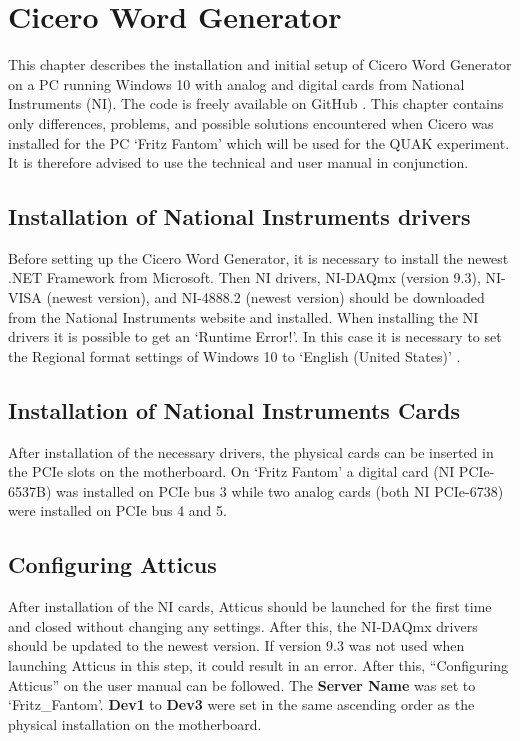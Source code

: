 
\chapter{Cicero Word Generator}\label{chap:Cicero, Cicero Word Generator}
This chapter describes the installation and initial setup of Cicero Word Generator \autocite{keshet2013distributed} on a PC running Windows 10 with analog and digital cards from National Instruments (NI). The code is freely available on GitHub \autocite{akeshet:Github}. This chapter contains only differences, problems, and possible solutions encountered when Cicero was installed for the PC `Fritz Fantom' which will be used for the QUAK experiment. It is therefore advised to use the technical and user manual \autocite{akeshet:manual} in conjunction.

\section{Installation of National Instruments drivers}\label{sec:Cicero, Installation of National Instruments drivers}
Before setting up the Cicero Word Generator, it is necessary to install the newest .NET Framework \autocite{microsoft:download.net} from Microsoft. Then NI drivers, NI-DAQmx (version 9.3), NI-VISA (newest version), and NI-4888.2 (newest version) should be downloaded from the National Instruments website \autocite{ni:drivers} and installed. When installing the NI drivers it is possible to get an `Runtime Error!'. In this case it is necessary to set the Regional format settings of Windows 10 to `English (United States)' \autocite{ni:runtimeerror}.

\section{Installation of National Instruments Cards}\label{sec:Cicero, Installation of National Instruments Cards}
After installation of the necessary drivers, the physical cards can be inserted in the PCIe slots on the motherboard. On `Fritz Fantom' a digital card (NI PCIe-6537B) was installed on PCIe bus 3 while two analog cards (both NI PCIe-6738) were installed on PCIe bus 4 and 5.

\section{Configuring Atticus}\label{sec:Cicero, Configuring Atticus}
After installation of the NI cards, Atticus should be launched for the first time and closed without changing any settings. After this, the NI-DAQmx drivers should be updated to the newest version. If version 9.3 was not used when launching Atticus in this step, it could result in an error. After this, ``Configuring Atticus'' on the user manual can be followed. The \textbf{Server Name} was set to `Fritz\_Fantom'. \textbf{Dev1} to \textbf{Dev3} were set in the same ascending order as the physical installation on the motherboard.

